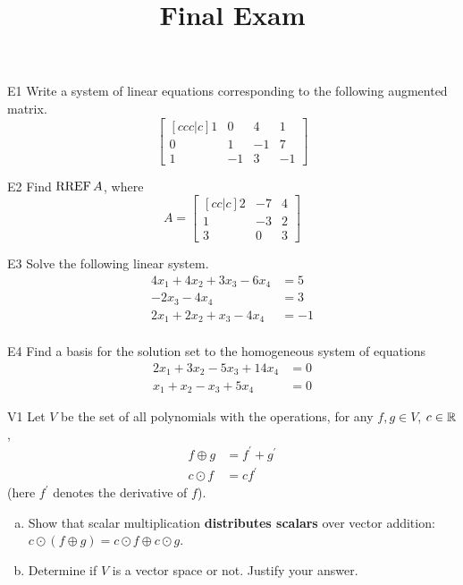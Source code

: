 \documentclass{sbgLAexam}
\title{Final Exam}
\begin{document}
\begin{problem}{E1}
Write a system of linear equations corresponding to the following
augmented matrix.
\[
\begin{bmatrix}[ccc|c]
1 & 0 & 4 & 1 \\
0 & 1 & -1 & 7 \\
1 & -1 & 3 & -1
\end{bmatrix}
\]
\end{problem}

\begin{problem}{E2}
Find \(\operatorname{RREF} A\), where
\[
  A =
  \begin{bmatrix}[cc|c]
    2 & -7 & 4 \\
    1 & -3 & 2 \\
    3 & 0 & 3
  \end{bmatrix}
\]
\end{problem}
\newpage

\begin{problem}{E3}
Solve the following linear system.
\begin{align*}
4x_1+4x_2+3x_3-6x_4 &= 5 \\
-2x_3-4x_4 &= 3 \\
2x_1+2x_2+x_3-4x_4 &= -1 \\
\end{align*}
\end{problem}

\begin{problem}{E4}
Find a basis for the solution set to the homogeneous system of equations
\begin{align*}
2x_1+3x_2-5x_3+14x_4 &= 0\\
x_1+x_2-x_3+5x_4 &= 0
\end{align*}
\end{problem}
\newpage

\begin{problem}{V1}
Let $V$ be the set of all polynomials with the operations, for any $f, g \in V$, $c \in \mathbb{R}$,
\begin{align*}
f \oplus g &= f^\prime + g^\prime \\
c \odot f &= c f^\prime
\end{align*}
(here $f^\prime$ denotes the derivative of $f$).
\begin{enumerate}[(a)]
\item Show that scalar multiplication \textbf{distributes scalars} over
      vector addition:
      \(c\odot(f \oplus g)=
      c\odot f \oplus c\odot g\).
\item Determine if $V$ is a vector space or not.  Justify your answer.
\end{enumerate}
\end{problem}
\end{document}
